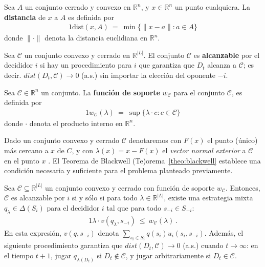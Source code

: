 \begin{definition}
\label{def:distancia}
Sea $A$ un conjunto cerrado y convexo en $\mathbb{R}^n$, y $x \in \mathbb{R}^n$ un punto cualquiera. La \textbf{distancia} de $x$ a $A$ es definida por
\begin{alignat}{1}
\text{dist}(x, A)\ =\ \min\{ \|x - a\| : a \in A \}
\end{alignat}
donde $\|\cdot\|$ denota la distancia euclidiana en $\mathbb{R}^n$.
\end{definition}

\begin{definition}
\label{def:alcanzable}
Sea $\mathcal{C}$ un conjunto convexo y cerrado en $\mathbb{R}^{|L|}$. El conjunto $\mathcal{C}$ es \textbf{alcanzable} por el decididor $i$ si hay un procedimiento para $i$ que garantiza que $D_t$ alcanza a $\mathcal{C}$; es decir. $dist(D_t, \mathcal{C}) \rightarrow 0$ (a.s.) sin importar la elección del oponente $-i$.
\end{definition}

\begin{definition}
\label{def:funcion-soporte}
Sea $\mathcal{C} \in \mathbb{R}^n$ un conjunto. La \textbf{función de soporte} $w_{\mathcal{C}}$ para el conjunto $\mathcal{C}$, es definida por
\begin{alignat}{1}
	w_{\mathcal{C}}(\lambda)\ =\ \sup\{\lambda \cdot c : c \in \mathcal{C} \}
\end{alignat}
donde $\cdot$ denota el producto interno en $\mathbb{R}^n$.
\end{definition}

Dado un conjunto convexo y cerrado $\mathcal{C}$ denotaremos con $F(x)$ el punto (único) más cercano a $x$ de $C$, y con $\lambda(x)= x - F(x)$ el \emph{vector normal exterior} a $\mathcal{C}$ en el punto $x$ .
El Teorema de Blackwell (Te)orema~\ref{theo:blackwell} establece una condición necesaria y suficiente para el problema planteado previamente.

\begin{theorem}
\label{theo:blackwell}
Sea $\mathcal{C} \subseteq \mathbb{R}^{|L|}$ un conjunto convexo y cerrado con función de soporte $w_{\mathcal{C}}$. Entonces, $\mathcal{C}$ es alcanzable por $i$ si y sólo si para todo $\lambda \in \mathbb{R}^{|L|}$, existe una estrategia mixta $q_{\lambda} \in \Delta(S_i)$ para el decididor $i$ tal que para todo $s_{-i}\in S_{-i}$:
\begin{alignat}{1}
  \lambda \cdot v(q_{\lambda}, s_{-i})\ \leq\ w_{\mathcal{C}}(\lambda) \,.
\end{alignat}
En esta expresión, $v(q, s_{-i})$ denota $\sum_{s_i \in S_i} q(s_i)u_i(s_i, s_{-i})$. 
Además, el siguiente procedimiento garantiza que $dist(D_t, \mathcal{C}) \rightarrow 0$ (a.s.) cuando $t \rightarrow \infty$: en el tiempo $t+1$, jugar $q_{\lambda(D_t)}$ si $D_t \notin \mathcal{C}$, y jugar arbitrariamente si $D_t \in \mathcal{C}$.
\end{theorem}

